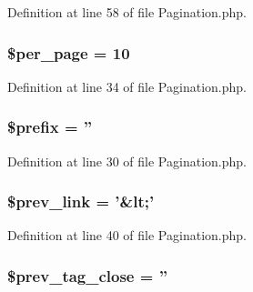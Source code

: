 Definition at line 58 of file Pagination.\-php.

\hypertarget{class_c_i___pagination_abece0f3099457a037f8f339811dc6e20}{
\subsubsection[{\$per\-\_\-page}]{\setlength{\rightskip}{0pt plus 5cm}\$per\-\_\-page = 10}}\label{class_c_i___pagination_abece0f3099457a037f8f339811dc6e20}


Definition at line 34 of file Pagination.\-php.

\hypertarget{class_c_i___pagination_a09e8cf95b9d29955a0bfabca9b420edc}{
\subsubsection[{\$prefix}]{\setlength{\rightskip}{0pt plus 5cm}\$prefix = ''}}\label{class_c_i___pagination_a09e8cf95b9d29955a0bfabca9b420edc}


Definition at line 30 of file Pagination.\-php.

\hypertarget{class_c_i___pagination_afab5c29a3da82c4dce6a491f1d257831}{
\subsubsection[{\$prev\-\_\-link}]{\setlength{\rightskip}{0pt plus 5cm}\$prev\-\_\-link = '\&{\bf lt};'}}\label{class_c_i___pagination_afab5c29a3da82c4dce6a491f1d257831}


Definition at line 40 of file Pagination.\-php.

\hypertarget{class_c_i___pagination_abb46001ebebf96f2562ea1f8ced80aa1}{
\subsubsection[{\$prev\-\_\-tag\-\_\-close}]{\setlength{\rightskip}{0pt plus 5cm}\$prev\-\_\-tag\-\_\-close = ''}}\label{class_c_i___pagination_abb46001ebebf96f2562ea1f8ced80aa1}


